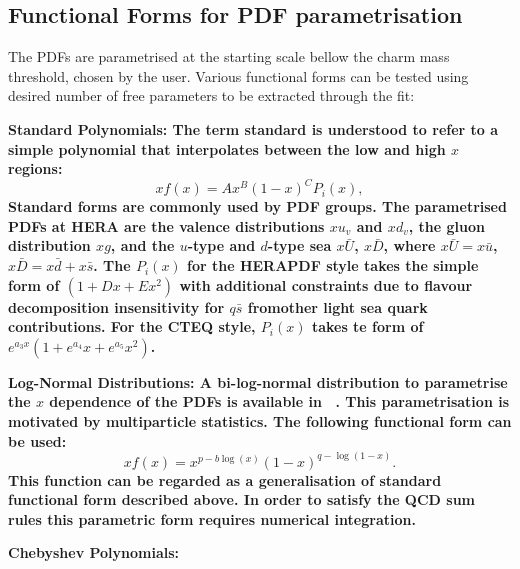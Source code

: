 \subsection{Functional Forms for PDF parametrisation}
The PDFs are parametrised at the starting scale bellow the charm mass threshold, chosen by the user. Various functional forms can be tested using desired number of free parameters to be extracted through the fit:
\begin{description}
\item \bf {Standard Polynomials:} \rm
The term standard is understood to refer to a simple polynomial 
that interpolates between the low and high $x$ regions:
\begin{equation}
 xf(x) = A x^{B} (1-x)^{C} P_i(x),
\label{eqn:pdf_std}
\end{equation}
Standard forms are commonly used by PDF groups.
The parametrised PDFs at HERA are the valence distributions
 $xu_v$ and  $xd_v$,  the gluon distribution $xg$, and the $u$-type and $d$-type sea 
$x\bar{U}$, $x\bar{D}$, where $x\bar{U} = x\bar{u}$, 
$x\bar{D} = x\bar{d} +x\bar{s}$. 
The $P_i(x)$ for the HERAPDF style takes the simple form of $(1 + D x + E x^2)$ with additional constraints due to flavour decomposition insensitivity for $q\bar{s}$ fromother light sea quark contributions. 
For the CTEQ style, $P_i(x)$ takes te form of $e^{a_3x} (1 + e^{a_4} x + e^{a_5} x^2)$.


\item \bf {Log-Normal Distributions:} \rm
A bi-log-normal distribution to parametrise the $x$ dependence of the PDFs is available in \fitter\ .
This parametrisation is motivated by  multiparticle statistics.
The following functional form can be used:
\begin{equation}
xf(x)=x^{p-b\log(x)}(1-x)^{q-\log(1-x)}.
\end{equation}
This function can be regarded as a generalisation of standard functional form described above. In order to satisfy the QCD sum rules this parametric form requires numerical integration.

\item \bf {Chebyshev Polynomials:} \rm


\end{description}
